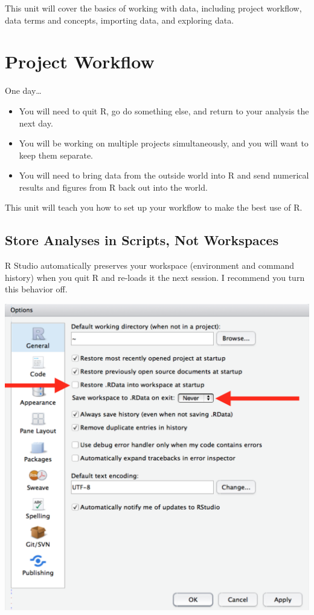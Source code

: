 \documentclass[
]{book}
\providecommand{\tightlist}{%
  \setlength{\itemsep}{0pt}\setlength{\parskip}{0pt}}
\begin{document}
This unit will cover the basics of working with data, including project workflow, data terms and concepts, importing data, and exploring data.

\hypertarget{project-workflow}{%
\section{Project Workflow}\label{project-workflow}}

One day\ldots{}

\begin{itemize}
\tightlist
\item
  You will need to quit R, go do something else, and return to your analysis the next day.
\item
  You will be working on multiple projects simultaneously, and you will want to keep them separate.
\item
  You will need to bring data from the outside world into R and send numerical results and figures from R back out into the world.
\end{itemize}

This unit will teach you how to set up your workflow to make the best use of R.

\hypertarget{store-analyses-in-scripts-not-workspaces}{%
\subsection{Store Analyses in Scripts, Not Workspaces}\label{store-analyses-in-scripts-not-workspaces}}

R Studio automatically preserves your workspace (environment and command history) when you quit R and re-loads it the next session. I recommend you turn this behavior off.

\begin{center}\includegraphics[width=0.7\linewidth]{img/rstudio-workspace} \end{center}
\end{document}
